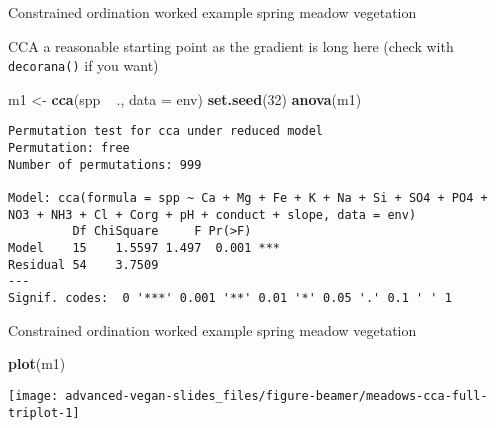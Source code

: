 \documentclass[10pt,ignorenonframetext,compress, aspectratio=169]{beamer}
\newenvironment{Shaded}{\begin{snugshade}}{\end{snugshade}}
\newcommand{\KeywordTok}[1]{\textcolor[rgb]{0.13,0.29,0.53}{\textbf{{#1}}}}
\newcommand{\DataTypeTok}[1]{\textcolor[rgb]{0.13,0.29,0.53}{{#1}}}
\newcommand{\DecValTok}[1]{\textcolor[rgb]{0.00,0.00,0.81}{{#1}}}
\newcommand{\StringTok}[1]{\textcolor[rgb]{0.31,0.60,0.02}{{#1}}}
\newcommand{\NormalTok}[1]{{#1}}
\begin{document}
\begin{frame}[fragile]{Constrained ordination worked example \textbar{}
spring meadow vegetation}

CCA a reasonable starting point as the gradient is long here (check with
\texttt{decorana()} if you want)

\scriptsize

\begin{Shaded}
\begin{Highlighting}[]
\NormalTok{m1 <-}\StringTok{ }\KeywordTok{cca}\NormalTok{(spp ~}\StringTok{ }\NormalTok{., }\DataTypeTok{data =} \NormalTok{env)}
\KeywordTok{set.seed}\NormalTok{(}\DecValTok{32}\NormalTok{)}
\KeywordTok{anova}\NormalTok{(m1)}
\end{Highlighting}
\end{Shaded}

\begin{verbatim}
Permutation test for cca under reduced model
Permutation: free
Number of permutations: 999

Model: cca(formula = spp ~ Ca + Mg + Fe + K + Na + Si + SO4 + PO4 + NO3 + NH3 + Cl + Corg + pH + conduct + slope, data = env)
         Df ChiSquare     F Pr(>F)    
Model    15    1.5597 1.497  0.001 ***
Residual 54    3.7509                 
---
Signif. codes:  0 '***' 0.001 '**' 0.01 '*' 0.05 '.' 0.1 ' ' 1
\end{verbatim}

\normalsize

\end{frame}

\begin{frame}[fragile]{Constrained ordination worked example \textbar{}
spring meadow vegetation}

\scriptsize

\begin{Shaded}
\begin{Highlighting}[]
\KeywordTok{plot}\NormalTok{(m1)}
\end{Highlighting}
\end{Shaded}

\begin{center}\texttt{[image: advanced-vegan-slides\_files/figure-beamer/meadows-cca-full-triplot-1]} \end{center}

\normalsize

\end{frame}
\end{document}
